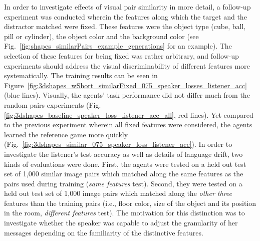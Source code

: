 In order to investigate effects of visual pair similarity in more detail, a follow-up experiment was conducted wherein the features along which the target and the distractor matched were fixed. These features were the object type (cube, ball, pill or cylinder), the object color and the background color (see Fig.~\ref{fig:shapes_similarPairs_example_generations} for an example).
The selection of these features for being fixed was rather arbitrary, and follow-up experiments should address the visual discriminability of different features more systematically. The training results can be seen in Figure~\ref{fig:3dshapes_wShort_similarFixed_075_speaker_losses_listener_acc} (blue lines). Visually, the agents' task performance did not differ much from the random pairs experiments (Fig. \ref{fig:3dshapes_baseline_speaker_loss_listener_acc_all}, red lines). Yet compared to the previous experiment wherein all fixed features were considered, the agents learned the reference game more quickly (Fig.~\ref{fig:3dshapes_similar_075_speaker_loss_listener_acc}). In order to investigate the listener's test accuracy as well as details of language drift, two kinds of evaluations were done. First, the agents were tested on a held out test set of 1,000 similar image pairs which matched along the same features as the pairs used during training (\textit{same features} test). Second, they were tested on a held out test set of 1,000 image pairs which matched along the \emph{other three} features than the training pairs (i.e., floor color, size of the object and its position in the room, \textit{different features} test). The motivation for this distinction was to investigate whether the speaker was capable to adjust the granularity of her messages depending on the familiarity of the distinctive features.

